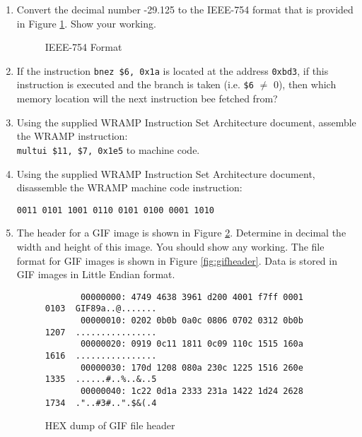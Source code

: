 \documentclass[a4paper,10pt]{article}
\begin{document}
\begin{enumerate}
\item Convert the decimal number -29.125 to the IEEE-754 format that is
provided in Figure \ref{fig:ieee754}. Show your working.

\begin{figure}[h]
\begin{center}
    \caption{IEEE-754 Format}
    \label{fig:ieee754}
  \end{center}
\end{figure}

\item If the instruction \texttt{bnez \$6, 0x1a} is located at the
address \texttt{0xbd3}, if this instruction is executed and the branch is taken
(i.e. \texttt{\$6} $\neq$ 0), then which memory location will the next
instruction bee fetched from?

\item Using the supplied WRAMP Instruction Set Architecture document,
assemble the WRAMP instruction:\\
\texttt{multui \$11, \$7, 0x1e5} to machine code.

\item Using the supplied WRAMP Instruction Set Architecture document,
disassemble the WRAMP machine code instruction:
\begin{center}
\texttt{0011 0101 1001 0110 0101 0100 0001 1010}
\end{center}

\item The header for a GIF image is shown in Figure
\ref{fig:gifhex}. Determine in decimal the width and height of this
image. You should show any working. The file format for GIF images is
shown in Figure \ref{fig:gifheader}. Data is stored in GIF images in
Little Endian format.

\begin{figure}[h]
{\small
\begin{verbatim}
       00000000: 4749 4638 3961 d200 4001 f7ff 0001 0103  GIF89a..@.......
       00000010: 0202 0b0b 0a0c 0806 0702 0312 0b0b 1207  ................
       00000020: 0919 0c11 1811 0c09 110c 1515 160a 1616  ................
       00000030: 170d 1208 080a 230c 1225 1516 260e 1335  ......#..%..&..5
       00000040: 1c22 0d1a 2333 231a 1422 1d24 2628 1734  ."..#3#..".$&(.4
\end{verbatim}}
\caption{HEX dump of GIF file header}
\label{fig:gifhex}
\end{figure}


\end{enumerate}
\end{document}
